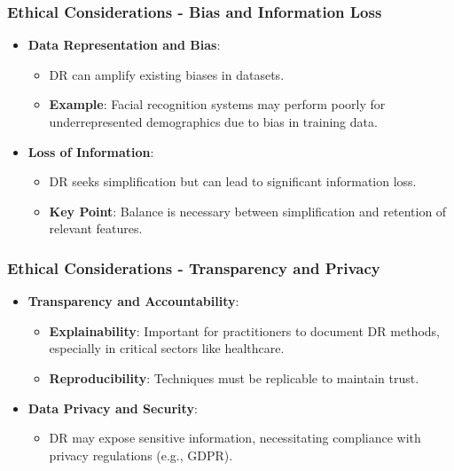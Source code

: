 \documentclass[aspectratio=169]{beamer}
\begin{document}
\begin{frame}[fragile]
  \frametitle{Ethical Considerations - Bias and Information Loss}
  \begin{itemize}
    \item \textbf{Data Representation and Bias}:
      \begin{itemize}
        \item DR can amplify existing biases in datasets.
        \item \textbf{Example}: Facial recognition systems may perform poorly for underrepresented demographics due to bias in training data.
      \end{itemize}
    
    \item \textbf{Loss of Information}:
      \begin{itemize}
        \item DR seeks simplification but can lead to significant information loss.
        \item \textbf{Key Point}: Balance is necessary between simplification and retention of relevant features.
      \end{itemize}
  \end{itemize}
\end{frame}

\begin{frame}[fragile]
  \frametitle{Ethical Considerations - Transparency and Privacy}
  \begin{itemize}
    \item \textbf{Transparency and Accountability}:
      \begin{itemize}
        \item \textbf{Explainability}: Important for practitioners to document DR methods, especially in critical sectors like healthcare.
        \item \textbf{Reproducibility}: Techniques must be replicable to maintain trust.
      \end{itemize}
    
    \item \textbf{Data Privacy and Security}:
      \begin{itemize}
        \item DR may expose sensitive information, necessitating compliance with privacy regulations (e.g., GDPR).
      \end{itemize}
  \end{itemize}
\end{frame}
\end{document}
